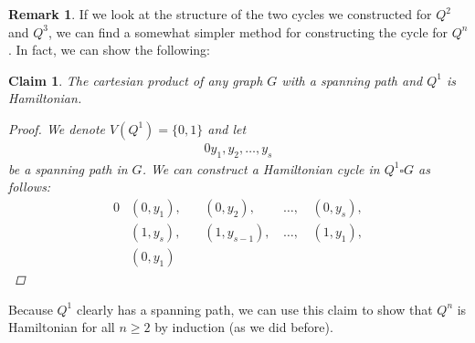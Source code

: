 \documentclass{amsart}
\theoremstyle{plain}
\newtheorem*{claim}{\textbf{Claim}}
\theoremstyle{definition}
\newtheorem*{rk}{\textbf{Remark}}
\begin{document}
    \begin{rk}
        If we look at the structure of the two cycles we constructed for $Q^2$ and $Q^3$,
        we can find a somewhat simpler method for constructing the cycle for $Q^n$.
        In fact, we can show the following:
        \begin{claim}
            The cartesian product of any graph $G$ with a spanning path and $Q^1$ is Hamiltonian.
            \begin{proof}
                We denote $V(Q^1) = \{0, 1\}$ and let
                \begin{alignat*}{0}
                    y_1, y_2, \ldots, y_s
                \end{alignat*}
                be a spanning path in $G$.
                We can construct a Hamiltonian cycle in $Q^1 \square G$ as follows:
                \begin{alignat*}{0}
                    & (0, y_1),\, && (0, y_2),\, & \ldots,\, & (0, y_s), \\
                    & (1, y_s),\, && (1, y_{s-1}),\, & \ldots,\, & (1, y_1),\\
                    & (0, y_1) &&&&
                \end{alignat*}
            \end{proof}
        \end{claim}
    \noindent Because $Q^1$ clearly has a spanning path, we can use this claim to show that $Q^n$ is Hamiltonian for all $n \geq 2$ by induction (as we did before).
    \end{rk}
\end{document}
